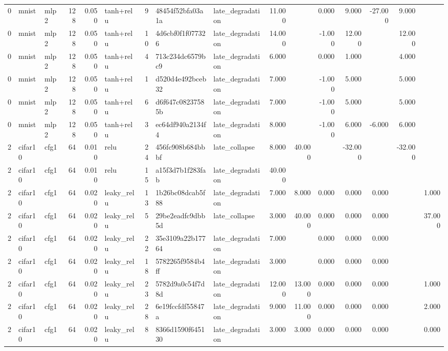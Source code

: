 \begin{table}[htbp]
{\begin{tabular}{@{}rllrrlrllrrrrrrr@{}}
0 & mnist & mlp2 & 128 & 0.050 & tanh+relu & 9 & 48454f52bfa03a1a & late\_degradation & 11.000 &  & 0.000 & 9.000 & -27.000 & 9.000 &  \\
0 & mnist & mlp2 & 128 & 0.050 & tanh+relu & 10 & 4d6cbf0f1f077326 & late\_degradation & 14.000 &  & -1.000 & 12.000 &  & 12.000 &  \\
0 & mnist & mlp2 & 128 & 0.050 & tanh+relu & 4 & 713c234dc6579bc9 & late\_degradation & 6.000 &  & 0.000 & 1.000 &  & 4.000 &  \\
0 & mnist & mlp2 & 128 & 0.050 & tanh+relu & 1 & d520d4e492bceb32 & late\_degradation & 7.000 &  & -1.000 & 5.000 &  & 5.000 &  \\
0 & mnist & mlp2 & 128 & 0.050 & tanh+relu & 6 & d6f647c08237585b & late\_degradation & 7.000 &  & -1.000 & 5.000 &  & 5.000 &  \\
0 & mnist & mlp2 & 128 & 0.050 & tanh+relu & 3 & ec64df940a2134f4 & late\_degradation & 8.000 &  & -1.000 & 6.000 & -6.000 & 6.000 &  \\
2 & cifar10 & cfg1 & 64 & 0.010 & relu & 24 & 456fc908b684bbbf & late\_collapse & 8.000 & 40.000 &  & -32.000 &  & -32.000 &  \\
2 & cifar10 & cfg1 & 64 & 0.010 & relu & 15 & a15f3d7b1f283fab & late\_degradation & 40.000 &  &  &  &  &  &  \\
2 & cifar10 & cfg1 & 64 & 0.020 & leaky\_relu & 13 & 1b26bc08dcab5f88 & late\_degradation & 7.000 & 8.000 & 0.000 & 0.000 & 0.000 &  & 1.000 \\
2 & cifar10 & cfg1 & 64 & 0.020 & leaky\_relu & 5 & 29be2eadfc9dbb5d & late\_collapse & 3.000 & 40.000 & 0.000 & 0.000 & 0.000 &  & 37.000 \\
2 & cifar10 & cfg1 & 64 & 0.020 & leaky\_relu & 22 & 35e3109a22b17764 & late\_degradation & 7.000 &  & 0.000 & 0.000 & 0.000 &  &  \\
2 & cifar10 & cfg1 & 64 & 0.020 & leaky\_relu & 18 & 5782265f9584b4ff & late\_degradation & 3.000 &  & 0.000 & 0.000 & 0.000 &  &  \\
2 & cifar10 & cfg1 & 64 & 0.020 & leaky\_relu & 23 & 5782d9a0c54f7d8d & late\_degradation & 12.000 & 13.000 & 0.000 & 0.000 & 0.000 &  & 1.000 \\
2 & cifar10 & cfg1 & 64 & 0.020 & leaky\_relu & 28 & 6e19fccfdf55847a & late\_degradation & 9.000 & 11.000 & 0.000 & 0.000 & 0.000 &  & 2.000 \\
2 & cifar10 & cfg1 & 64 & 0.020 & leaky\_relu & 8 & 8366d1590f645130 & late\_degradation & 3.000 & 3.000 & 0.000 & 0.000 & 0.000 &  & 0.000 \\

\end{tabular}}
\end{table}
